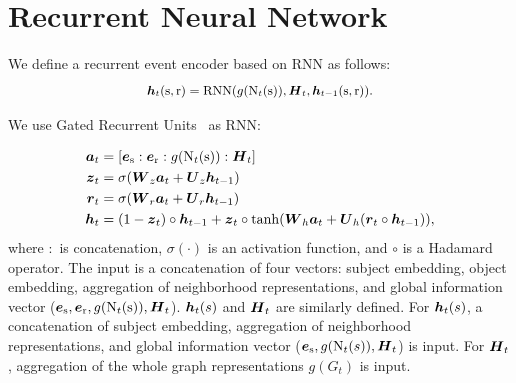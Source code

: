 

\section{Recurrent Neural Network}

\label{append:eventseq}
We define a recurrent event encoder based on RNN as follows:
\begin{equation*}
	\small \boldsymbol{h}_{t}(\mathrm{s},\mathrm{r}) = \textrm{RNN}(g(\text{N}_{t}(\mathrm{s})), \boldsymbol{H}_t, \boldsymbol{h}_{t-1}(\mathrm{s},\mathrm{r})).
\end{equation*}

We use Gated Recurrent Units~\citep{Cho2014LearningPR} as RNN:

\small
\begin{align*}
    \boldsymbol{a}_{t} &= [\boldsymbol{e}_{\mathrm{s}}: \boldsymbol{e}_{\mathrm{r}}: g(\text{N}_{t}(\mathrm{s})): \boldsymbol{H}_t]\\
    \boldsymbol{z}_t &= \sigma(\boldsymbol{W}_z \boldsymbol{a}_{t} + \boldsymbol{U}_z \boldsymbol{h}_{t-1})\\
    \boldsymbol{r}_t &= \sigma(\boldsymbol{W}_r \boldsymbol{a}_{t} + \boldsymbol{U}_r \boldsymbol{h}_{t-1})\\
    \boldsymbol{h}_t &= (1-\boldsymbol{z}_t)\circ \boldsymbol{h}_{t-1} + \boldsymbol{z}_t \circ \tanh(\boldsymbol{W}_h \boldsymbol{a}_{t} + \boldsymbol{U}_h (\boldsymbol{r}_t \circ \boldsymbol{h}_{t-1})),
\end{align*}
\normalsize
where $:$ is concatenation, $\sigma(\cdot)$ is an activation function, and $\circ$ is a Hadamard operator.
The input is a concatenation of four vectors: subject embedding, object embedding, aggregation of neighborhood representations, and global information vector ($\boldsymbol{e}_{\mathrm{s}}, \boldsymbol{e}_{\mathrm{r}}, g(\text{N}_{t}(\mathrm{s})), \boldsymbol{H}_t$).
$\boldsymbol{h}_t(s)$ and $\boldsymbol{H}_t$ are similarly defined. For $\boldsymbol{h}_t(s)$, a concatenation of subject embedding, aggregation of neighborhood representations, and global information vector ($\boldsymbol{e}_{\mathrm{s}}, g(\text{N}_t(s)), \boldsymbol{H}_t$) is input. For $\boldsymbol{H}_t$, aggregation of the whole graph representations $g(G_t)$ is input.

